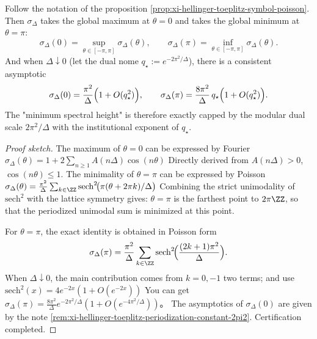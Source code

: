 \begin{proposition}\label{prop:xi-hellinger-toeplitz-symbol-extrema-qstar}
Follow the notation of the proposition \ref{prop:xi-hellinger-toeplitz-symbol-poisson}.
Then \(\sigma_\Delta\) takes the global maximum at \(\theta=0\) and takes the global minimum at \(\theta=\pi\):
\[
\sigma_\Delta(0)=\sup_{\theta\in[-\pi,\pi]}\sigma_\Delta(\theta),
\qquad
\sigma_\Delta(\pi)=\inf_{\theta\in[-\pi,\pi]}\sigma_\Delta(\theta).
\]
And when \(\Delta\downarrow 0\) (let the dual nome \(q_\star:=e^{-2\pi^2/\Delta}\)), there is a consistent asymptotic
\[
\sigma_\Delta(0)=\frac{\pi^2}{\Delta}\Bigl(1+O(q_\star^{2})\Bigr),
\qquad
\sigma_\Delta(\pi)=\frac{8\pi^2}{\Delta}\,q_\star\Bigl(1+O(q_\star^{2})\Bigr).
\]
The "minimum spectral height" is therefore exactly capped by the modular dual scale \(2\pi^2/\Delta\) with the institutional exponent of \(q_\star\).
\end{proposition}
\begin{proof}[Proof sketch]
The maximum of \(\theta=0\) can be expressed by Fourier
\(
\sigma_\Delta(\theta)=1+2\sum_{n\ge 1}A(n\Delta)\cos(n\theta)
\)
Directly derived from \(A(n\Delta)>0\), \(\cos(n\theta)\le 1\).
The minimality of \(\theta=\pi\) can be expressed by Poisson
\(
\sigma_\Delta(\theta)=\frac{\pi^2}{\Delta}\sum_{k\in\ZZ}\mathrm{sech}^2\!\bigl(\pi(\theta+2\pi k)/\Delta\bigr)
\)
Combining the strict unimodality of \(\mathrm{sech}^2\) with the lattice symmetry gives: \(\theta=\pi\) is the farthest point to \(2\pi\ZZ\), so that the periodized unimodal sum is minimized at this point.
\par
For \(\theta=\pi\), the exact identity is obtained in Poisson form
\[
\sigma_\Delta(\pi)=\frac{\pi^2}{\Delta}\sum_{k\in\ZZ}\mathrm{sech}^2\!\Bigl(\frac{(2k+1)\pi^2}{\Delta}\Bigr).
\]
When \(\Delta\downarrow 0\), the main contribution comes from \(k=0,-1\) two terms; and use
\(
\mathrm{sech}^2(x)=4e^{-2x}(1+O(e^{-2x}))
\)
You can get
\(
\sigma_\Delta(\pi)=\frac{8\pi^2}{\Delta}e^{-2\pi^2/\Delta}(1+O(e^{-4\pi^2/\Delta}))
\)。
The asymptotics of \(\sigma_\Delta(0)\) are given by the note \ref{rem:xi-hellinger-toeplitz-periodization-constant-2pi2}. Certification completed.
\end{proof}

